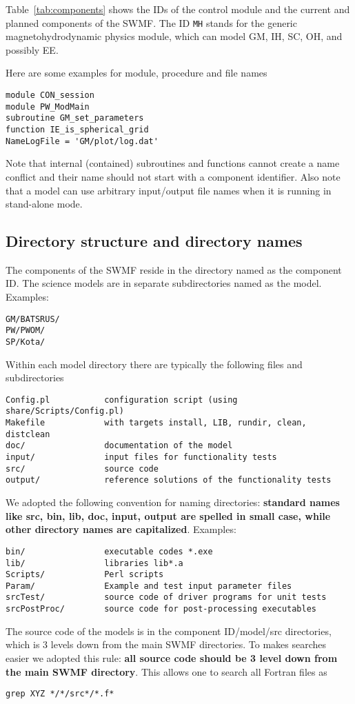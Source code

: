 \documentclass{article}
\begin{document}
\bigskip

Table~\ref{tab:components} shows the IDs of the control module and the
current and planned components of the SWMF.
The ID {\tt MH} stands for the generic magnetohydrodynamic
physics module, which can model GM, IH, SC, OH, and possibly EE.

Here are some examples for module, procedure and file names
\begin{verbatim}
module CON_session
module PW_ModMain
subroutine GM_set_parameters
function IE_is_spherical_grid
NameLogFile = 'GM/plot/log.dat'
\end{verbatim}
Note that internal (contained) subroutines and functions cannot create
a name conflict and their name should not start with a component identifier. 
Also note that a model can use arbitrary input/output 
file names when it is running in stand-alone mode.

\subsection{Directory structure and directory names}

The components of the SWMF reside in the directory named as the component ID.
The science models are in separate subdirectories named as the model.
Examples:
\begin{verbatim}
GM/BATSRUS/
PW/PWOM/
SP/Kota/
\end{verbatim}
Within each model directory there are typically the following files 
and subdirectories
\begin{verbatim}
Config.pl           configuration script (using share/Scripts/Config.pl)
Makefile            with targets install, LIB, rundir, clean, distclean
doc/                documentation of the model
input/              input files for functionality tests
src/                source code
output/             reference solutions of the functionality tests
\end{verbatim}
We adopted the following convention for naming directories:
{\bf standard names like src, bin, lib, doc, input, output are spelled
in small case, while other directory names are capitalized}. Examples:
\begin{verbatim}
bin/                executable codes *.exe
lib/                libraries lib*.a
Scripts/            Perl scripts
Param/              Example and test input parameter files
srcTest/            source code of driver programs for unit tests
srcPostProc/        source code for post-processing executables
\end{verbatim}
The source code of the models is in the component ID/model/src directories,
which is 3 levels down from the main SWMF directories. To makes searches 
easier we adopted this rule: {\bf all source code should be 3 level down from
the main SWMF directory}. This allows one to search all Fortran files as
\begin{verbatim}
grep XYZ */*/src*/*.f*
\end{verbatim}
\end{document}
